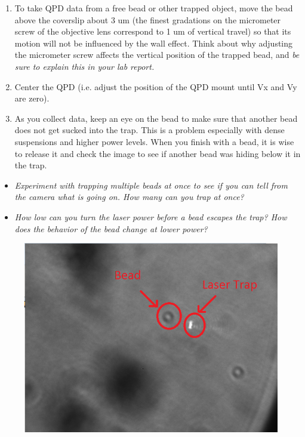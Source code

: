 \documentclass{../lab}
\begin{document}
\begin{enumerate}
    \item To take QPD data from a free bead or other trapped object, move the bead above the coverslip about 3 um (the finest gradations on the micrometer screw of the objective lens correspond to 1 um of vertical travel) so that its motion will not be influenced by the wall effect. Think about why adjusting the micrometer screw affects the vertical position of the trapped bead, and \emph{be sure to explain this in your lab report.}

    \item Center the QPD (i.e. adjust the position of the QPD mount until Vx and Vy are zero).

    \item As you collect data, keep an eye on the bead to make sure that another bead does not get sucked into the trap. This is a problem especially with dense suspensions and higher power levels. When you finish with a bead, it is wise to release it and check the image to see if another bead was hiding below it in the trap.

\end{enumerate}

\begin{itemize}
    \item \emph{Experiment with trapping multiple beads at once to see if you can tell from the camera what is going on. How many can you trap at once?}

\end{itemize}

\begin{itemize}
    \item \emph{How low can you turn the laser power before a bead escapes the trap? How does the behavior of the bead change at lower power?}

\end{itemize}


\begin{figure}[h]
    \centering
    \href{http://experimentationlab.berkeley.edu/sites/default/files/OTZ/laserwithbead.png}{\includegraphics[width=0.5\linewidth]{images/laserwithbead.png}}
    \caption{}
    \label{fig:laserwithbead}
\end{figure}
\end{document}

